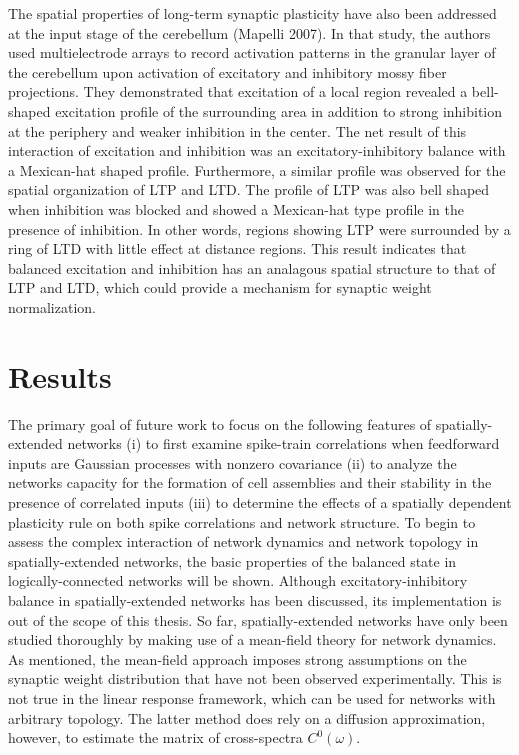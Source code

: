 \documentclass{ucetd}
\begin{document}
The spatial properties of long-term synaptic plasticity have also been addressed at the input stage of the cerebellum (Mapelli 2007). In that study, the authors used multielectrode arrays to record activation patterns in the granular layer of the cerebellum upon activation of excitatory and inhibitory mossy fiber projections. They demonstrated that excitation of a local region revealed a bell-shaped excitation profile of the surrounding area in addition to strong inhibition at the periphery and weaker inhibition in the center. The net result of this interaction of excitation and inhibition was an excitatory-inhibitory balance with a Mexican-hat shaped profile. Furthermore, a similar profile was observed for the spatial organization of LTP and LTD. The profile of LTP was also bell shaped when inhibition was blocked and showed a Mexican-hat type profile in the presence of inhibition. In other words, regions showing LTP were surrounded by a ring of LTD with little effect at distance regions. This result indicates that balanced excitation and inhibition has an analagous spatial structure to that of LTP and LTD, which could provide a mechanism for synaptic weight normalization.


\section{Results}

The primary goal of future work to focus on the following features of spatially-extended networks (i) to first examine spike-train correlations when feedforward inputs are Gaussian processes with nonzero covariance (ii) to analyze the networks capacity for the formation of cell assemblies and their stability in the presence of correlated inputs (iii) to determine the effects of a spatially dependent plasticity rule on both spike correlations and network structure. To begin to assess the complex interaction of network dynamics and network topology in spatially-extended networks, the basic properties of the balanced state in logically-connected networks will be shown. Although excitatory-inhibitory balance in spatially-extended networks has been discussed, its implementation is out of the scope of this thesis. So far, spatially-extended networks have only been studied thoroughly by making use of a mean-field theory for network dynamics. As mentioned, the mean-field approach imposes strong assumptions on the synaptic weight distribution that have not been observed experimentally. This is not true in the linear response framework, which can be used for networks with arbitrary topology. The latter method does rely on a diffusion approximation, however, to estimate the matrix of cross-spectra $C^{0}(\omega)$. 
\end{document}
